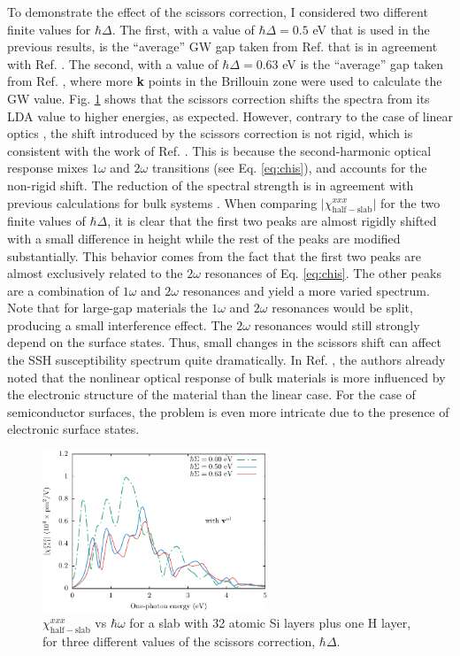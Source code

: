 To demonstrate the effect of the scissors correction, I considered two different
finite values for $\hbar\Delta$. The first, with a value of $\hbar\Delta=0.5$ eV
that is used in the previous results, is the ``average'' GW gap taken from Ref.
\cite{rohlfingPRB95} that is in agreement with Ref. \cite{garciaCPC01}. The
second, with a value of $\hbar\Delta=0.63$ eV is the ``average'' gap taken from
Ref. \cite{asahiPRB00}, where more \textbf{k} points in the Brillouin zone were
used to calculate the GW value. Fig. \ref{fig:scissors} shows that the scissors
correction shifts the spectra from its LDA value to higher energies, as
expected. However, contrary to the case of linear optics \cite{cabellosPRB09},
the shift introduced by the scissors correction is not rigid, which is
consistent with the work of Ref. \cite{nastosPRB05}. This is because the
second-harmonic optical response mixes $1\omega$ and $2\omega$ transitions (see
Eq. \eqref{eq:chis}), and accounts for the non-rigid shift. The reduction of the
spectral strength is in agreement with previous calculations for bulk systems
\cite{nastosPRB05, luppiPRB10, leitsmannPRB05}. When comparing
$\vert\chi^{xxx}_{\mathrm{half-slab}}\vert$ for the two finite values of
$\hbar\Delta$, it is clear that the first two peaks are almost rigidly shifted
with a small difference in height while the rest of the peaks are modified
substantially. This behavior comes from the fact that the first two peaks are
almost exclusively related to the $2\omega$ resonances of Eq.
\eqref{eq:chis}. The other peaks are a combination of $1\omega$ and $2\omega$
resonances and yield a more varied spectrum. Note that for large-gap materials
the $1\omega$ and $2\omega$ resonances would be split, producing a small
interference effect. The $2\omega$ resonances would still strongly depend on the
surface states. Thus, small changes in the scissors shift can affect the SSH
susceptibility spectrum quite dramatically. In Ref. \cite{adolphPRB00}, the
authors already noted that the nonlinear optical response of bulk materials is
more influenced by the electronic structure of the material than the linear
case. For the case of semiconductor surfaces, the problem is even more intricate
due to the presence of electronic surface states.

\begin{figure}[b]
\centering 
\includegraphics[width=0.6\textwidth]{content/figures/fig-Si2x1-scissors}
\caption{$\chi^{xxx}_{\mathrm{half-slab}}$ vs $\hbar\omega$ for a slab with 32
atomic Si layers plus one H layer, for three different values of the scissors
correction, $\hbar\Delta$.
\label{fig:scissors}} 
\end{figure}

